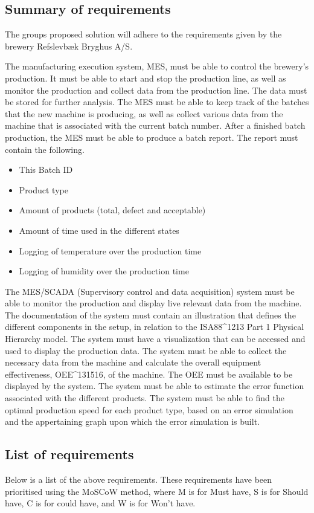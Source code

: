 \subsection{Summary of requirements}
The groups proposed solution will adhere to the requirements given by the brewery Refslevbæk Bryghus A/S.

The manufacturing execution system, MES, must be able to control the brewery’s production.
It must be able to start and stop the production line,
as well as monitor the production and collect data from the production line.
The data must be stored for further analysis.
The MES must be able to keep track of the batches that the new machine is producing,
as well as collect various data from the machine that is associated with the current batch number.
After a finished batch production, the MES must be able to produce a batch report.
The report must contain the following.

\begin{itemize}
    \item This Batch ID
    \item Product type
    \item Amount of products (total, defect and acceptable)
    \item Amount of time used in the different states
    \item Logging of temperature over the production time
    \item Logging of humidity over the production time
\end{itemize}

The MES/SCADA (Supervisory control and data acquisition) system must be able to monitor the production and display live relevant data from the machine.
The documentation of the system must contain an illustration that defines the different components in the setup, in relation to the ISA88\^{}1213 Part 1 Physical Hierarchy model.
The system must have a visualization that can be accessed and used to display the production data.
The system must be able to collect the necessary data from the machine and calculate the overall equipment effectiveness, OEE\^{}131516, of the machine. The OEE must be available to be displayed by the system.
The system must be able to estimate the error function associated with the different products.
The system must be able to find the optimal production speed for each product type, based on an error simulation and the appertaining graph upon which the error simulation is built.

\subsection{List of requirements}
Below is a list of the above requirements. These requirements have been
prioritised using the MoSCoW method, where M is for Must have, S is for
Should have, C is for could have, and W is for Won't have. 

